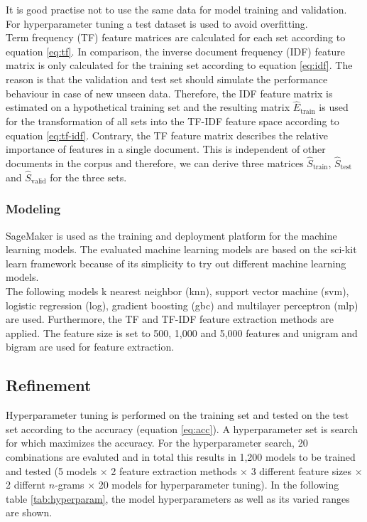 \documentclass[a4paper,12pt,nottoc]{article}
\begin{document}
\noindent It is good practise not to use the same data for model training and validation. For hyperparameter tuning a test dataset is used to avoid overfitting.\\

\noindent Term frequency (TF) feature matrices are calculated for each set according to equation \ref{eq:tf}. In comparison, the inverse document frequency (IDF) feature matrix is only calculated for the training set according to equation \ref{eq:idf}. The reason is that the validation and test set should simulate the performance behaviour in case of new unseen data. Therefore,  the IDF feature matrix is estimated on a hypothetical training set and the resulting matrix $\hat{E}_{\textrm{train}}$ is used for the transformation of all sets into the TF-IDF feature space according to equation \ref{eq:tf-idf}. Contrary, the TF feature matrix describes the relative importance of features in a single document. This is independent of other documents in the corpus and therefore, we can derive three matrices $\hat{S}_{\textrm{train}}$, $\hat{S}_{\textrm{test}}$ and $\hat{S}_{\textrm{valid}}$ for the three sets.

\subsubsection{Modeling}

\noindent SageMaker \cite{bib:sagemaker} is used as the training and deployment platform for the machine learning models. The evaluated machine learning models are based on the sci-kit learn framework \cite{bib:scikit-learn} because of its simplicity to try out different machine learning models.\\

\noindent The following models k nearest neighbor (knn), support vector machine (svm), logistic regression (log), gradient boosting (gbc) and multilayer perceptron (mlp) are used. Furthermore, the TF and TF-IDF feature extraction methods are applied. The feature size is set to 500, 1,000 and 5,000 features and unigram and bigram are used for feature extraction.

\subsection{Refinement}

Hyperparameter tuning is performed on the training set and tested on the test set according to the accuracy (equation \ref{eq:acc}). A hyperparameter set is search for which maximizes the accuracy. For the hyperparameter search, 20 combinations are evaluted and in total this results in 1,200 models to be trained and tested (5 models $\times$ 2 feature extraction methods $\times$  3 different feature sizes $\times$ 2 differnt $n$-grams $\times$ 20 models for hyperparameter tuning). In the following table \ref{tab:hyperparam}, the model hyperparameters as well as its varied ranges are shown. 
\end{document}
